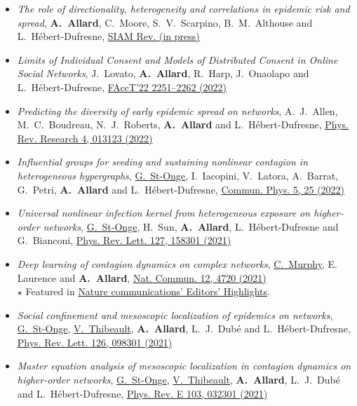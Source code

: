 \documentclass[11pt]{article}
\begin{document}
\begin{itemize}[itemsep=0.5em]
%
  \item \textit{The role of directionality, heterogeneity and correlations in epidemic risk and spread}, \textbf{A.~Allard}, C.~Moore, S.~V.~Scarpino, B.~M.~Althouse and L.~H\'ebert-Dufresne, \href{https://arxiv.org/abs/2005.11283}{SIAM Rev. (in press)}
%
  \item \textit{Limits of Individual Consent and Models of Distributed Consent in Online Social Networks}, J.~Lovato, \textbf{A.~Allard}, R.~Harp, J.~Onaolapo and L.~H\'ebert-Dufresne, \href{https://doi.org/10.1145/3531146.3534640}{FAccT'22 2251--2262 (2022)}
%
  \item \textit{Predicting the diversity of early epidemic spread on networks}, A.~J.~Allen, M.~C.~Boudreau, N.~J.~Roberts, \textbf{A.~Allard} and L.~H\'ebert-Dufresne, \href{https://doi.org/10.1103/PhysRevResearch.4.013123}{Phys. Rev. Research 4, 013123 (2022)}
%
  \item \textit{Influential groups for seeding and sustaining nonlinear contagion in heterogeneous hypergraphs}, \uline{G.~St-Onge}, I.~Iacopini, V.~Latora, A.~Barrat, G.~Petri, \textbf{A.~Allard} and L.~H\'ebert-Dufresne, \href{https://doi.org/10.1038/s42005-021-00788-w}{Commun. Phys. 5, 25 (2022)}
%
  \item \textit{Universal nonlinear infection kernel from heterogeneous exposure on higher-order networks}, \uline{G.~St-Onge}, H.~Sun, \textbf{A.~Allard}, L.~H\'ebert-Dufresne and G.~Bianconi, \href{https://doi.org/10.1103/PhysRevLett.127.158301}{Phys. Rev. Lett. 127, 158301 (2021)}
%
  \item \textit{Deep learning of contagion dynamics on complex networks}, \uline{C.~Murphy}, E. Laurence and \textbf{A.~Allard}, \href{https://arxiv.org/abs/2006.05410}{Nat. Commun. 12, 4720 (2021)}\\
  {\footnotesize $\star$ Featured in \href{https://www.nature.com/ncomms/editorshighlights}{Nature communications' Editors' Highlights}.}
%
  \item \textit{Social confinement and mesoscopic localization of epidemics on networks}, \uline{G.~St-Onge}, \uline{V.~Thibeault}, \textbf{A.~Allard}, L.~J.~Dub\'e and L.~H\'ebert-Dufresne, \href{http://doi.org/10.1103/PhysRevLett.126.098301}{Phys. Rev. Lett. 126, 098301 (2021)}
%
  \item \textit{Master equation analysis of mesoscopic localization in contagion dynamics on higher-order networks}, \uline{G.~St-Onge}, \uline{V.~Thibeault}, \textbf{A.~Allard}, L.~J.~Dub\'e and L.~H\'ebert-Dufresne, \href{http://doi.org/10.1103/PhysRevE.103.032301}{Phys. Rev. E 103, 032301 (2021)}

\end{itemize}
\end{document}

